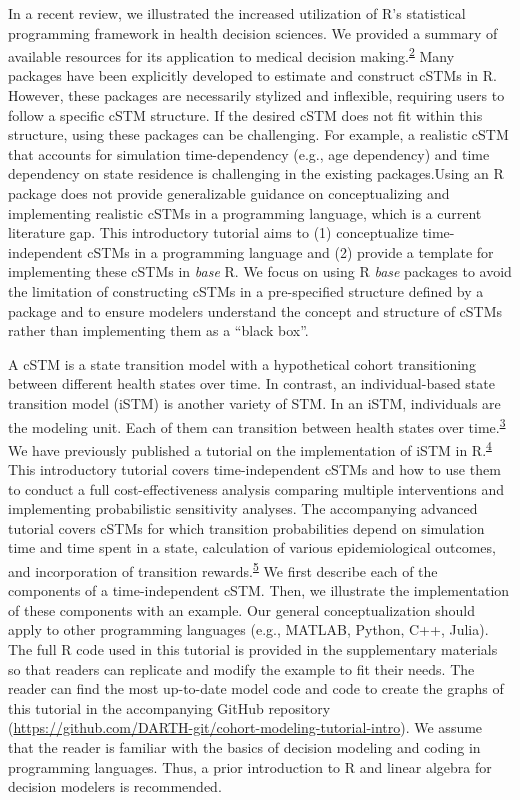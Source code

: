 \documentclass[
]{article}
\begin{document}
In a recent review, we illustrated the increased utilization of R's statistical programming framework in health decision sciences. We provided a summary of available resources for its application to medical decision making.\textsuperscript{\protect\hyperlink{ref-Jalal2017b}{2}} Many packages have been explicitly developed to estimate and construct cSTMs in R. However, these packages are necessarily stylized and inflexible, requiring users to follow a specific cSTM structure. If the desired cSTM does not fit within this structure, using these packages can be challenging. For example, a realistic cSTM that accounts for simulation time-dependency (e.g., age dependency) and time dependency on state residence is challenging in the existing packages.Using an R package does not provide generalizable guidance on conceptualizing and implementing realistic cSTMs in a programming language, which is a current literature gap. This introductory tutorial aims to (1) conceptualize time-independent cSTMs in a programming language and (2) provide a template for implementing these cSTMs in \emph{base} R. We focus on using R \emph{base} packages to avoid the limitation of constructing cSTMs in a pre-specified structure defined by a package and to ensure modelers understand the concept and structure of cSTMs rather than implementing them as a ``black box''.

A cSTM is a state transition model with a hypothetical cohort transitioning between different health states over time. In contrast, an individual-based state transition model (iSTM) is another variety of STM. In an iSTM, individuals are the modeling unit. Each of them can transition between health states over time.\textsuperscript{\protect\hyperlink{ref-Siebert2012c}{3}} We have previously published a tutorial on the implementation of iSTM in R.\textsuperscript{\protect\hyperlink{ref-Krijkamp2018}{4}} This introductory tutorial covers time-independent cSTMs and how to use them to conduct a full cost-effectiveness analysis comparing multiple interventions and implementing probabilistic sensitivity analyses. The accompanying advanced tutorial covers cSTMs for which transition probabilities depend on simulation time and time spent in a state, calculation of various epidemiological outcomes, and incorporation of transition rewards.\textsuperscript{\protect\hyperlink{ref-Alarid-Escudero2021b}{5}} We first describe each of the components of a time-independent cSTM. Then, we illustrate the implementation of these components with an example. Our general conceptualization should apply to other programming languages (e.g., MATLAB, Python, C++, Julia). The full R code used in this tutorial is provided in the supplementary materials so that readers can replicate and modify the example to fit their needs. The reader can find the most up-to-date model code and code to create the graphs of this tutorial in the accompanying GitHub repository (\url{https://github.com/DARTH-git/cohort-modeling-tutorial-intro}). We assume that the reader is familiar with the basics of decision modeling and coding in programming languages. Thus, a prior introduction to R and linear algebra for decision modelers is recommended.
\end{document}
